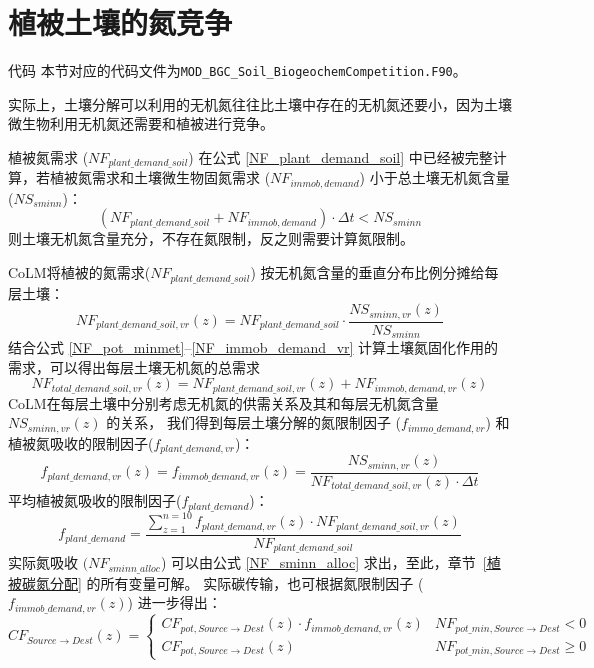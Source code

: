 \section{植被土壤的氮竞争}\label{植被土壤的氮竞争}
\begin{mymdframed}{代码}
本节对应的代码文件为\texttt{MOD\_BGC\_Soil\_BiogeochemCompetition.F90}。
\end{mymdframed}
实际上，土壤分解可以利用的无机氮往往比土壤中存在的无机氮还要小，因为土壤微生物利用无机氮还需要和植被进行竞争。

植被氮需求 ($NF_{plant\_{demand\_{soil}}}$) 在公式 \eqref{NF_plant_demand_soil} 中已经被完整计算，若植被氮需求和土壤微生物固氮需求 ($NF_{immob,demand}$) 小于总土壤无机氮含量(${NS}_{sminn}$)：
\begin{equation}
    \left(NF_{plant\_{demand\_{soil}}}+NF_{immob,demand}\right)\cdot\Delta t<NS_{sminn}
\end{equation}
则土壤无机氮含量充分，不存在氮限制，反之则需要计算氮限制。

CoLM将植被的氮需求($NF_{plant\_{demand\_{soil}}}$) 按无机氮含量的垂直分布比例分摊给每层土壤：
\begin{equation}
    NF_{plant\_{demand\_{soil}},vr}(z)=NF_{plant\_{demand\_{soil}}}\cdot\frac{NS_{sminn,vr}(z)}{NS_{sminn}}
\end{equation}
结合公式 \eqref{NF_pot_minmet}--\eqref{NF_immob_demand_vr} 计算土壤氮固化作用的需求，可以得出每层土壤无机氮的总需求
\begin{equation}
    NF_{total\_{demand\_{soil}},vr}(z)=NF_{plant\_{demand\_{soil}},vr}(z)+NF_{immob,demand,vr}\left(z\right)
\end{equation}
CoLM在每层土壤中分别考虑无机氮的供需关系及其和每层无机氮含量 ${NS}_{sminn,vr}(z)$ 的关系，
我们得到每层土壤分解的氮限制因子 ($f_{immo\_{demand},vr}$) 和植被氮吸收的限制因子($f_{plant\_{demand},vr}$)：
\begin{equation}
    f_{plant\_{demand},vr}(z)=f_{immob\_{demand},vr}(z)=\frac{NS_{sminn,vr}(z)}{NF_{total\_{demand\_{soil}},vr}(z)\cdot\Delta t}
\end{equation}
平均植被氮吸收的限制因子($f_{plant\_{demand}}$)：
\begin{equation}
    f_{plant\_{demand}}=\frac{\sum_{z=1}^{n=10}{f_{plant\_{demand},vr}(z)\cdot NF_{plant\_{demand\_{soil}},vr}(z)}}{NF_{plant\_{demand\_{soil}}}}
\end{equation}
实际氮吸收 $(NF_{sminn\_{alloc}}$) 可以由公式 \eqref{NF_sminn_alloc} 求出，至此，章节~\ref{植被碳氮分配} 的所有变量可解。
实际碳传输，也可根据氮限制因子 ($f_{immob\_{demand},vr}(z)$) 进一步得出：
\begin{equation}
CF_{Source \rightarrow { Dest }}(z)=\left\{\begin{array}{ll}C F_{pot, Source \rightarrow Dest}(z) \cdot f_{{immob}\_{demand}, vr}(z) & NF_{pot\_{min}, Source \rightarrow {Dest}} <0 \\ 
CF_{pot, Source \rightarrow { Dest }}(z) & NF_{pot\_{min}, Source \rightarrow {Dest}} \geqslant 0
\end{array}\right.
\end{equation}

